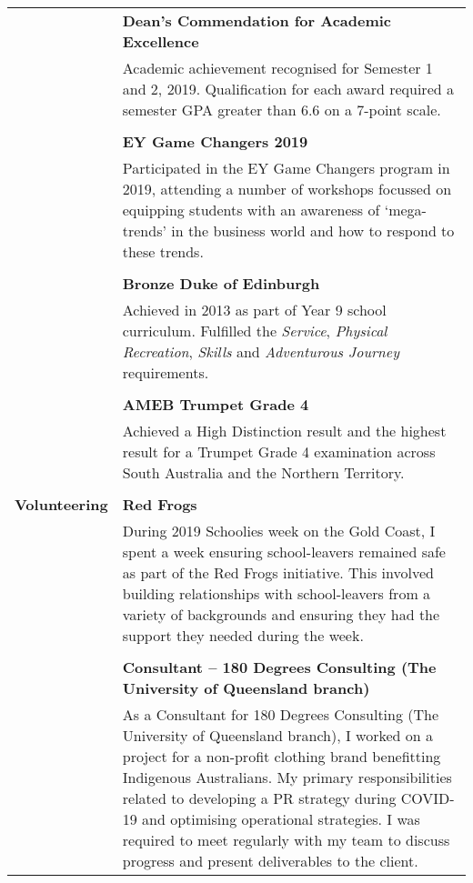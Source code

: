 \documentclass[a4paper]{article}
\begin{document}
\begin{longtable}{r p{13.5cm}}
										\vline & \textbf{Dean's Commendation for Academic Excellence} \\
										\vline & Academic achievement recognised for Semester 1 and 2, 2019. Qualification for each award required a semester GPA greater than 6.6 on a 7-point scale. \\
										\vline & \\
										
										\vline & \textbf{EY Game Changers 2019} \\
										\vline & Participated in the EY Game Changers program in 2019, attending a number of workshops focussed on equipping students with an awareness of ‘mega-trends’ in the business world and how to respond to these trends. \\
										\vline & \\
										
										\vline & \textbf{Bronze Duke of Edinburgh} \\
										\vline & Achieved in 2013 as part of Year 9 school curriculum. Fulfilled the \textit{Service}, \textit{Physical Recreation}, \textit{Skills} and \textit{Adventurous Journey} requirements. \\
										\vline & \\
										
										\vline & \textbf{AMEB Trumpet Grade 4} \\
										\vline & Achieved a High Distinction result and the highest result for a Trumpet Grade 4 examination across South Australia and the Northern Territory. \\
										& \\
										
	\textbf{Volunteering} 	\vline & \textbf{Red Frogs} \\
										\vline & During 2019 Schoolies week on the Gold Coast, I spent a week ensuring school-leavers remained safe as part of the Red Frogs initiative. This involved building relationships with school-leavers from a variety of backgrounds and ensuring they had the support they needed during the week. \\
										\vline & \\
										
										\vline & \textbf{Consultant – 180 Degrees Consulting (The University of Queensland branch)} \\
										\vline & As a Consultant for 180 Degrees Consulting (The University of Queensland branch), I worked on a project for a non-profit clothing brand benefitting Indigenous Australians. My primary responsibilities related to developing a PR strategy during COVID-19 and optimising operational strategies. I was required to meet regularly with my team to discuss progress and present deliverables to the client. \\
\end{longtable}
\end{document}
